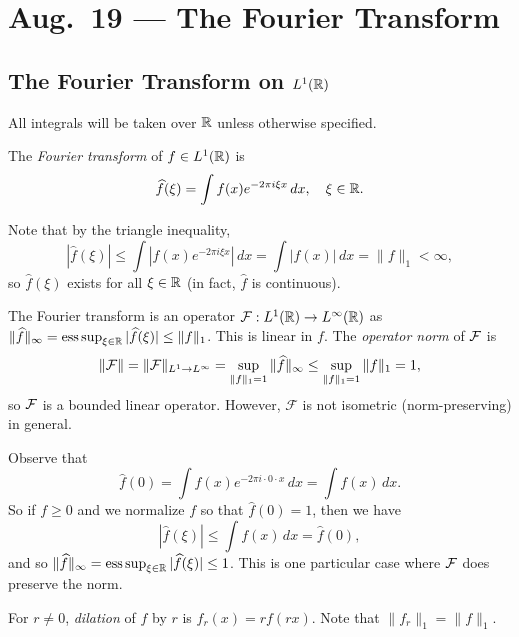 \chapter{Aug.~19 --- The Fourier Transform}

\section{The Fourier Transform on \texorpdfstring{$L^1(\mathbb{R})$}{L1(R)}}

All integrals will be taken over $\mathbb{R}$
unless otherwise specified.

\begin{definition}
  The \emph{Fourier transform} of
  $f \in L^1(\mathbb{R})$ is
  \[
    \widehat{f}(\xi)
    = \int f(x) e^{-2\pi i \xi x}\, dx,
    \quad \xi \in \mathbb{R}.
  \]
\end{definition}

\begin{remark}
  Note that by the triangle inequality,
  \[
    |\widehat{f}(\xi)|
    \le \int |f(x) e^{-2\pi i \xi x}|\, dx
    = \int |f(x)|\, dx
    = \|f\|_{1}
    < \infty,
  \]
  so $\widehat{f}(\xi)$ exists
  for all $\xi \in \mathbb{R}$ (in fact,
  $\widehat{f}$ is continuous).
\end{remark}

\begin{remark}
  The Fourier transform is an
  operator $\mathcal{F} : L^1(\mathbb{R}) \to L^\infty(\mathbb{R})$
  as
  $\|\widehat{f}\|_\infty = \operatorname*{ess\,sup}_{\xi \in \mathbb{R}} |\widehat{f}(\xi)| \le \|f\|_1$.
  This is linear in $f$.
  The \emph{operator norm} of
  $\mathcal{F}$ is
  \[
    \|\mathcal{F}\| = \|\mathcal{F}\|_{L^1 \to L^\infty}
    = \sup_{\|f\|_1 = 1} \|\widehat{f}\|_\infty
    \le \sup_{\|f\|_1 = 1} \|f\|_1
    = 1,
  \]
  so $\mathcal{F}$ is a bounded linear operator.
  However, $\mathcal{F}$ is
  not isometric (norm-preserving)
  in general.
\end{remark}

\begin{remark}
  Observe that
  \[
    \widehat{f}(0)
    = \int f(x) e^{-2\pi i \cdot 0 \cdot x}\, dx
    = \int f(x)\, dx.
  \]
  So if $f \ge 0$ and we normalize
  $f$ so that $\widehat{f}(0) = 1$, then
  we have
  \[
    |\widehat{f}(\xi)|
    \le \int f(x)\, dx = \widehat{f}(0),
  \]
  and so $\|\widehat{f}\|_\infty = \operatorname*{ess\,sup}_{\xi \in \mathbb{R}} |\widehat{f}(\xi)| \le 1$.
  This is one particular
  case where $\mathcal{F}$ does preserve the norm.
\end{remark}

\begin{definition}
  For $r \ne 0$, \emph{dilation} of
  $f$ by $r$ is $f_r(x) = rf(rx)$.
  Note that $\|f_r\|_1 = \|f\|_1$.
\end{definition}

